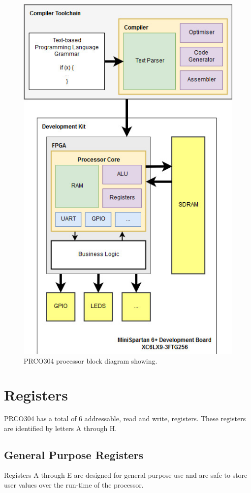 \documentclass[11pt,a4paper]{report}
\newcommand{\scname}{PRCO304}
\begin{document}
\begin{figure}[H]
\begin{center}
\includegraphics[scale=0.5]{hld}
\end{center}
\caption{\scname{} processor block diagram showing.}
\label{fig:core_hld}
\end{figure}

\section{Registers}
\scname{} has a total of 6 addressable, read and write, registers. These registers are identified by letters A through H.

\subsection{General Purpose Registers}
Registers A through E  are designed for general purpose use and are safe to store user values over the run-time of the processor.
\end{document}
